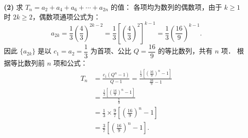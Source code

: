 \begin{answer}
\textbf{(2)}
求 $T_n = a_2 + a_4 + a_6 + \cdots + a_{2n}$ 的值：
各项均为数列的偶数项，由于 $k \geqslant 1$ 时 $2k \geqslant 2$，偶数项通项公式为：
\nopagebreak[4]
\[
a_{2k} = \frac{1}{3}\left(\frac{4}{3}\right)^{2k - 2} = \frac{1}{3}\left[\left(\frac{4}{3}\right)^2\right]^{k-1} = \frac{1}{3}\left(\frac{16}{9}\right)^{k-1}.
\]
因此 $\{a_{2k}\}$ 是以 $c_1 = a_2 = \dfrac{1}{3}$ 为首项、公比 $Q = \dfrac{16}{9}$ 的等比数列，共有 $n$ 项．
根据等比数列前 $n$ 项和公式：
\nopagebreak[4]
\[
\begin{aligned}
T_n &= \frac{c_1 (Q^n - 1)}{Q - 1} = \frac{\frac{1}{3}\left[\left(\frac{16}{9}\right)^n - 1\right]}{\frac{16}{9} - 1} \\
&= \frac{\frac{1}{3}\left[\left(\frac{16}{9}\right)^n - 1\right]}{\frac{7}{9}} \\
&= \frac{1}{3} \times \frac{9}{7}\left[\left(\frac{16}{9}\right)^n - 1\right] \\
&= \frac{3}{7}\left[\left(\frac{16}{9}\right)^n - 1\right].
\end{aligned}
\]



\end{answer}
